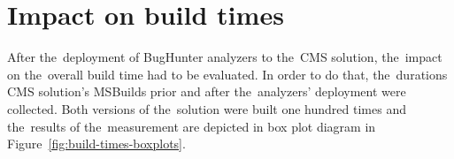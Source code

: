 \documentclass[
  digital, %
  table,   %
  lof,     %
  lot,     %
  oneside,
]{fithesis3}
\begin{document}
%
%
%
%

\section{Impact on build times}
\label{sec:build-times}
After the~deployment of BugHunter analyzers to the~CMS solution, the~impact on the~overall build time had to be evaluated. In order to do that, the~durations CMS solution's MSBuilds prior and after the~analyzers' deployment were collected. Both versions of the~solution were built one hundred times and the~results of the~measurement are depicted in box plot diagram in Figure~\ref{fig:build-times-boxplots}.
\end{document}
